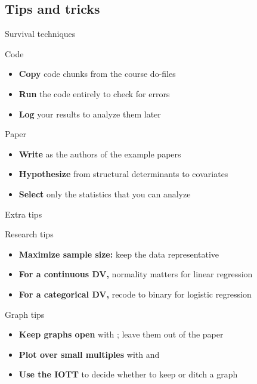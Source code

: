 \documentclass[t]{beamer}
\begin{document}
	\subsection{Tips and tricks}
	
	\begin{frame}[t]{Survival techniques}
		
		\begin{block}{Code}
			\begin{itemize}
				\item \textbf{Copy} code chunks from the course do-files
				\item \textbf{Run} the code entirely to check for errors
				\item \textbf{Log} your results to analyze them later
			\end{itemize}
		\end{block}
		
		\begin{block}{Paper}
			\begin{itemize}
				\item \textbf{Write} as the authors of the example papers
				\item \textbf{Hypothesize} from structural determinants to covariates 
				\item \textbf{Select} only the statistics that you can analyze
			\end{itemize}
		\end{block}
		
	\end{frame}

	\begin{frame}[t]{Extra tips}

		\begin{block}{Research tips}
			\begin{itemize}
				\item \textbf{Maximize sample size:} %
					keep the data representative
				\item \textbf{For a continuous DV,} %
					normality matters for linear regression
				\item \textbf{For a categorical DV,} %
					recode to binary for logistic regression
			\end{itemize}
		\end{block}
		
		\begin{block}{Graph tips}
			\begin{itemize}
				\item \textbf{Keep graphs open} %
					with ; leave them out of the paper
				\item \textbf{Plot over small multiples} %
					with  and  
				\item \textbf{Use the IOTT} %
					to decide whether to keep or ditch a graph
			\end{itemize}
		\end{block}
		
	\end{frame}
\end{document}
